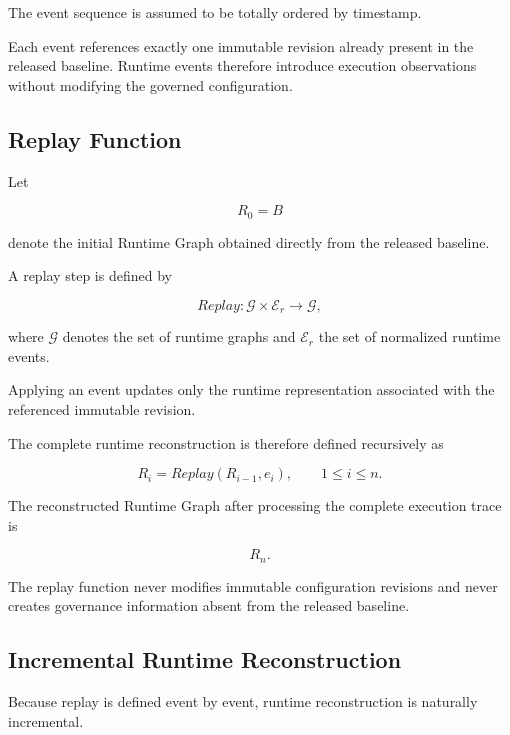 \documentclass[10pt]{article}
\begin{document}
The event sequence is assumed to be totally ordered by timestamp.

Each event references exactly one immutable revision already present in the
released baseline. Runtime events therefore introduce execution observations
without modifying the governed configuration.

\subsection{Replay Function}
\label{appendix:replay_function}

Let

\[
R_0=B
\]

denote the initial Runtime Graph obtained directly from the released baseline.

A replay step is defined by

\begin{equation}
Replay
:
\mathcal G
\times
\mathcal E_r
\rightarrow
\mathcal G,
\end{equation}

where $\mathcal G$ denotes the set of runtime graphs and
$\mathcal E_r$ the set of normalized runtime events.

Applying an event updates only the runtime representation associated with the
referenced immutable revision.

The complete runtime reconstruction is therefore defined recursively as

\begin{equation}
R_i
=
Replay
(
R_{i-1},
e_i
),
\qquad
1\le i\le n.
\end{equation}

The reconstructed Runtime Graph after processing the complete execution trace is

\[
R_n.
\]

The replay function never modifies immutable configuration revisions and never
creates governance information absent from the released baseline.

\subsection{Incremental Runtime Reconstruction}
\label{appendix:incremental_runtime_reconstruction}

Because replay is defined event by event, runtime reconstruction is naturally
incremental.
\end{document}
